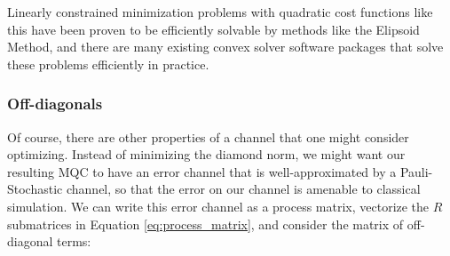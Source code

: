 \documentclass[aps,nofootinbib,pra,notitlepage,twocolumn]{revtex4-1}
\begin{document}
Linearly constrained minimization problems with quadratic cost functions like this have been proven to be efficiently solvable by methods like the Elipsoid Method\cite{wright1999numerical, khachiyan}, and there are many existing convex solver software packages that solve these problems efficiently in practice.






\subsubsection{Off-diagonals} %
\label{sub:off_diagonals}
Of course, there are other properties of a channel that one might consider optimizing. Instead of minimizing the diamond norm, we might want our resulting MQC to have an error channel that is well-approximated by a Pauli-Stochastic channel, so that the error on our channel is amenable to classical simulation. We can write this error channel as a process matrix, vectorize the $R$ submatrices in Equation \ref{eq:process_matrix}, and consider the matrix of off-diagonal terms:
\end{document}
